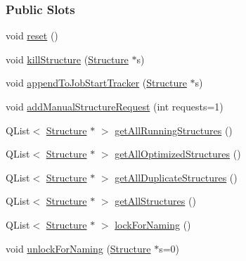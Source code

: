 \subsubsection*{Public Slots}
\begin{DoxyCompactItemize}
\item 
void \hyperlink{classGlobalSearch_1_1QueueManager_a36c7fd5b33bd74babfd68ee746e5017c}{reset} ()
\item 
void \hyperlink{classGlobalSearch_1_1QueueManager_aa79f26f791ec8315f2ae36d820bfa0ac}{kill\+Structure} (\hyperlink{classGlobalSearch_1_1Structure}{Structure} $\ast$s)
\item 
void \hyperlink{classGlobalSearch_1_1QueueManager_aa010ca43a5ec0c5ce653c4ab5bfebb27}{append\+To\+Job\+Start\+Tracker} (\hyperlink{classGlobalSearch_1_1Structure}{Structure} $\ast$s)
\item 
void \hyperlink{classGlobalSearch_1_1QueueManager_ab04255999ca9a52f471b37141e9e3f6e}{add\+Manual\+Structure\+Request} (int requests=1)
\item 
Q\+List$<$ \hyperlink{classGlobalSearch_1_1Structure}{Structure} $\ast$ $>$ \hyperlink{classGlobalSearch_1_1QueueManager_abb5985273cbb0126bf065acb76c2be51}{get\+All\+Running\+Structures} ()
\item 
Q\+List$<$ \hyperlink{classGlobalSearch_1_1Structure}{Structure} $\ast$ $>$ \hyperlink{classGlobalSearch_1_1QueueManager_a05ab94e45df60fb8c9078fbf81a2d80c}{get\+All\+Optimized\+Structures} ()
\item 
Q\+List$<$ \hyperlink{classGlobalSearch_1_1Structure}{Structure} $\ast$ $>$ \hyperlink{classGlobalSearch_1_1QueueManager_a14ab987c7a7939e27ba84010e9943bdd}{get\+All\+Duplicate\+Structures} ()
\item 
Q\+List$<$ \hyperlink{classGlobalSearch_1_1Structure}{Structure} $\ast$ $>$ \hyperlink{classGlobalSearch_1_1QueueManager_ad77db239019da90a79040b680f2398dc}{get\+All\+Structures} ()
\item 
Q\+List$<$ \hyperlink{classGlobalSearch_1_1Structure}{Structure} $\ast$ $>$ \hyperlink{classGlobalSearch_1_1QueueManager_a11aa65d1cc9c13424a8eac1c08fe9c0b}{lock\+For\+Naming} ()
\item 
void \hyperlink{classGlobalSearch_1_1QueueManager_a5f8012e4b5d002c444bfc486084feec1}{unlock\+For\+Naming} (\hyperlink{classGlobalSearch_1_1Structure}{Structure} $\ast$s=0)
\end{DoxyCompactItemize}
